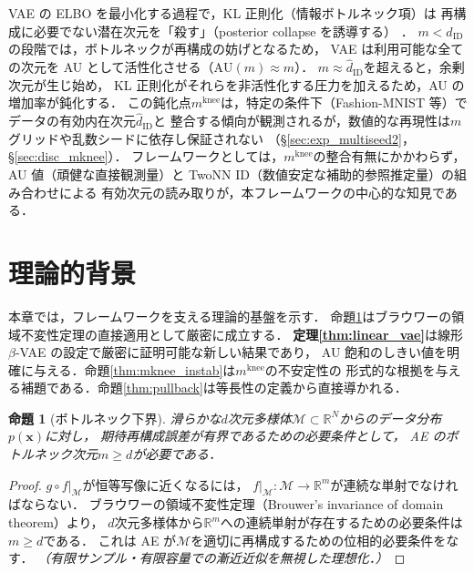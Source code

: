 \documentclass[11pt,a4paper]{jsarticle}
\newtheorem{proposition}{命題}
\newcommand{\R}{\mathbb{R}}
\newcommand{\mknee}{m^{\mathrm{knee}}}
\begin{document}
VAE の ELBO を最小化する過程で，KL 正則化（情報ボトルネック項）は
再構成に必要でない潜在次元を「殺す」（posterior collapse を誘導する）
\cite{lucas2019elbo,higgins2017betavae}．
$m < \hat{d}_\mathrm{ID}$の段階では，ボトルネックが再構成の妨げとなるため，
VAE は利用可能な全ての次元を AU として活性化させる（$\mathrm{AU}(m) \approx m$）．
$m \approx \hat{d}_\mathrm{ID}$を超えると，余剰次元が生じ始め，
KL 正則化がそれらを非活性化する圧力を加えるため，AU の増加率が鈍化する．
この鈍化点$\mknee$は，特定の条件下（Fashion-MNIST 等）でデータの有効内在次元$\hat{d}_\mathrm{ID}$と
整合する傾向が観測されるが，数値的な再現性は$m$グリッドや乱数シードに依存し保証されない
（§\ref{sec:exp_multiseed2}，§\ref{sec:disc_mknee}）．
フレームワークとしては，$\mknee$の整合有無にかかわらず，
AU 値（頑健な直接観測量）と TwoNN ID（数値安定な補助的参照推定量）の組み合わせによる
有効次元の読み取りが，本フレームワークの中心的な知見である．

\section{理論的背景}\label{sec:theory}

本章では，フレームワークを支える理論的基盤を示す．
命題\ref{thm:lower_bound}はブラウワーの領域不変性定理の直接適用として厳密に成立する．
\textbf{定理\ref{thm:linear_vae}}は線形$\beta$-VAE の設定で厳密に証明可能な新しい結果であり，
AU 飽和のしきい値を明確に与える．命題\ref{thm:mknee_instab}は$\mknee$の不安定性の
形式的な根拠を与える補題である．命題\ref{thm:pullback}は等長性の定義から直接導かれる．

\begin{proposition}[ボトルネック下界]\label{thm:lower_bound}
滑らかな$d$次元多様体$\mathcal{M} \subset \R^N$からのデータ分布$p(\boldsymbol{x})$に対し，
期待再構成誤差が有界であるための必要条件として，
AE のボトルネック次元$m \geq d$が必要である．
\end{proposition}

\begin{proof}
$g \circ f|_\mathcal{M}$が恒等写像に近くなるには，
$f|_\mathcal{M}: \mathcal{M} \to \R^m$が連続な単射でなければならない．
ブラウワーの領域不変性定理（Brouwer's invariance of domain theorem）\cite{hatcher2002algebraic}より，
$d$次元多様体から$\R^m$への連続単射が存在するための必要条件は$m \geq d$である．
これは AE が$\mathcal{M}$を適切に再構成するための位相的必要条件をなす．
\textit{（有限サンプル・有限容量での漸近近似を無視した理想化．）}
\end{proof}
\end{document}
